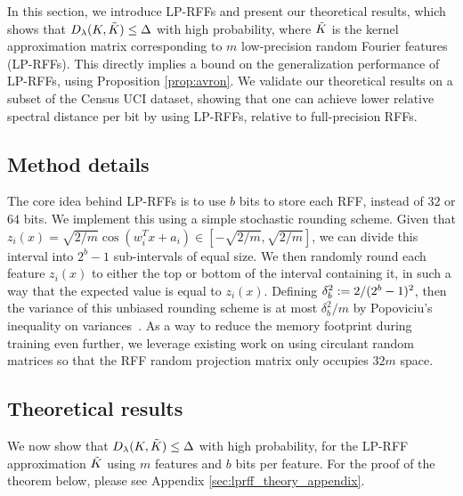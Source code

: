 In this section, we introduce LP-RFFs and present our theoretical results, which shows that $D_{\lambda}(K,\tilde{K}) \leq \Delta$ with high probability, where $\tilde{K}$ is the kernel approximation matrix corresponding to $m$ low-precision random Fourier features (LP-RFFs). This directly implies a bound on the generalization performance of LP-RFFs, using Proposition \ref{prop:avron}. We validate our theoretical results on a subset of the Census UCI dataset, showing that one can achieve lower relative spectral distance per bit by using LP-RFFs, relative to full-precision RFFs.

\subsection{Method details}
\label{subsec:method_details}
The core idea behind LP-RFFs is to use $b$ bits to store each RFF, instead of $32$ or $64$ bits. We implement this using a simple stochastic rounding scheme. Given that $z_i(x) = \sqrt{2/m}\cos(w_i^T x + a_i) \in [-\sqrt{2/m},\sqrt{2/m}]$, we can divide this interval into $2^b - 1$ sub-intervals of equal size. We then randomly round each feature $z_i(x)$ to either the top or bottom of the interval containing it, in such a way that the expected value is equal to $z_i(x)$. Defining $\delta_b^2 := 2/(2^b-1)^2$, then the variance of this unbiased rounding scheme is at most $\delta_b^2/m$ by Popoviciu's inequality on variances~\cite{popoviciu1935equations}.  As a way to reduce the memory footprint during training even further, we leverage existing work on using circulant random matrices \citep{yu15} so that the RFF random projection matrix only occupies $32m$ space.

\subsection{Theoretical results}

We now show that $D_{\lambda}(K,\tilde{K}) \leq \Delta$ with high probability, for the LP-RFF approximation $\tilde{K}$ using $m$ features and $b$ bits per feature.  For the proof of the theorem below, please see Appendix \ref{sec:lprff_theory_appendix}.

